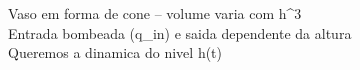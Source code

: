 \documentclass[preview]{standalone}
\begin{document}
Vaso em forma de cone -- volume varia com h^{3}\\Entrada bombeada (q_in) e saida dependente da altura\\Queremos a dinamica do nivel h(t)\\
\end{document}
